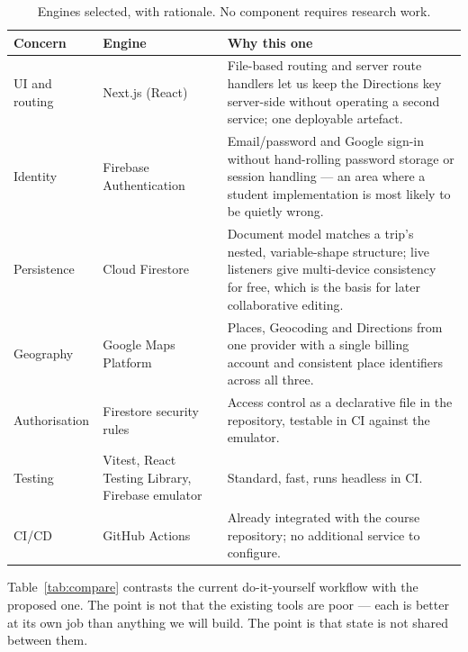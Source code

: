 \documentclass[11pt,a4paper]{article}
\begin{document}
\begin{table}[htbp]
\centering
\footnotesize
\caption{Engines selected, with rationale. No component
  requires research work.}
\label{tab:engines}
\begin{tabularx}{\textwidth}{@{}l l X@{}}
\toprule
\textbf{Concern} & \textbf{Engine} & \textbf{Why this one} \\
\midrule
UI and routing & Next.js (React) & File-based routing and server
  route handlers let us keep the Directions key server-side without
  operating a second service; one deployable artefact. \\
Identity & Firebase Authentication & Email/password and Google
  sign-in without hand-rolling password storage or session handling
  --- an area where a student implementation is most likely to be
  quietly wrong. \\
Persistence & Cloud Firestore & Document model matches a trip's
  nested, variable-shape structure; live listeners give
  multi-device consistency for free, which is the basis for later
  collaborative editing. \\
Geography & Google Maps Platform & Places, Geocoding and Directions
  from one provider with a single billing account and consistent
  place identifiers across all three. \\
Authorisation & Firestore security rules & Access control as a
  declarative file in the repository, testable in CI against the
  emulator. \\
Testing & Vitest, React Testing Library, Firebase emulator &
  Standard, fast, runs headless in CI. \\
CI/CD & GitHub Actions & Already integrated with the course
  repository; no additional service to configure. \\
\bottomrule
\end{tabularx}
\end{table}

Table~\ref{tab:compare} contrasts the current
do-it-yourself workflow with the proposed one. The
point is not that the existing tools are poor --- each
is better at its own job than anything we will build.
The point is that state is not shared between them.
\end{document}
